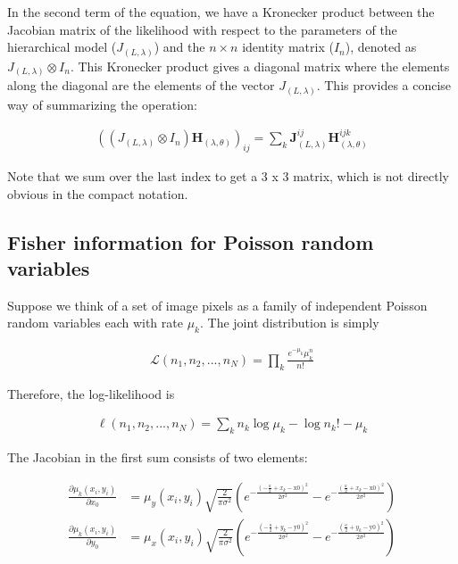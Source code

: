 \documentclass{ucetd}
\begin{document}
In the second term of the equation, we have a Kronecker product between the Jacobian matrix of the likelihood with respect to the parameters of the hierarchical model ($J_{(L,\lambda)}$) and the $n\times n$ identity matrix ($I_n$), denoted as $J_{(L,\lambda)}\otimes I_n$. This Kronecker product gives a diagonal matrix where the elements along the diagonal are the elements of the vector $J_{(L,\lambda)}$. This provides a concise way of summarizing the operation:

\begin{align*}
((J_{(L,\lambda)}\otimes I_{n})\mathbf{H}_{(\lambda,\theta)})_{ij} = \sum_{k}\mathbf{J}_{(L,\lambda)}^{ij}\mathbf{H}_{(\lambda,\theta)}^{ijk}
\end{align*}

Note that we sum over the last index to get a 3 x 3 matrix, which is not directly obvious in the compact notation.

\subsection{Fisher information for Poisson random variables}

Suppose we think of a set of image pixels as a family of independent Poisson random variables each with rate $\mu_{k}$. The joint distribution is simply

\begin{align*}
\mathcal{L}(n_{1},n_{2},...,n_{N}) = \prod_{k} \frac{e^{-\mu_{k}}\mu_{k}^{n}}{n!}
\end{align*}

Therefore, the log-likelihood is

\begin{align*}
\ell(n_{1},n_{2},...,n_{N}) = \sum_{k} n_{k}\log\mu_{k} - \log n_{k}! - \mu_{k}
\end{align*}

The Jacobian in the first sum consists of two elements:

\begin{align*}
\frac{\partial \mu_{k}(x_{i},y_{i})}{\partial x_{0}} &= \mu_{y}(x_{i},y_{i})\sqrt{\frac{2}{\pi\sigma^{2}}}\left(e^{-\frac{\left(-\frac{a}{2}+x_{k}-\text{x0}\right)^2}{2 \sigma ^2}}-e^{-\frac{\left(\frac{a}{2}+x_{k}-\text{x0}\right)^2}{2 \sigma ^2}}\right)\\
\frac{\partial \mu_{k}(x_{i},y_{i})}{\partial y_{0}} &= \mu_{x}(x_{i},y_{i})\sqrt{\frac{2}{\pi\sigma^{2}}}\left(e^{-\frac{\left(-\frac{a}{2}+y_{k}-\text{y0}\right)^2}{2 \sigma ^2}}-e^{-\frac{\left(\frac{a}{2}+y_{k}-\text{y0}\right)^2}{2 \sigma ^2}}\right)
\end{align*}
\end{document}
